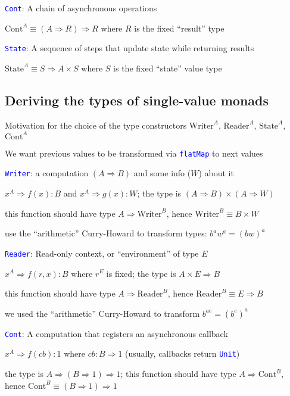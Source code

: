 \texttt{\textcolor{blue}{\footnotesize{}Cont}}: A chain of asynchronous
operations

$\text{Cont}^{A}\equiv\left(A\Rightarrow R\right)\Rightarrow R$ where
$R$ is the fixed ``result'' type

\texttt{\textcolor{blue}{\footnotesize{}State}}: A sequence of steps
that update state while returning results

$\text{State}^{A}\equiv S\Rightarrow A\times S$ where $S$ is the
fixed ``state'' value type


\subsection{Deriving the types of single-value monads}

Motivation for the choice of the type constructors $\text{Writer}^{A}$,
$\text{Reader}^{A}$, $\text{State}^{A}$, $\text{Cont}^{A}$

We want previous values to be transformed via \texttt{\textcolor{blue}{\footnotesize{}flatMap}}
to next values

\texttt{\textcolor{blue}{\footnotesize{}Writer}}: a computation $\left(A\Rightarrow B\right)$
and some info ($W$) about it

$x^{A}\Rightarrow f(x):B$ and $x^{A}\Rightarrow g(x):W$; the type
is $\left(A\Rightarrow B\right)\times\left(A\Rightarrow W\right)$

this function should have type $A\Rightarrow\text{Writer}^{B}$, hence
$\text{Writer}^{B}\equiv B\times W$ 

use the ``arithmetic'' Curry-Howard to transform types: $b^{a}w^{a}=(bw)^{a}$

\texttt{\textcolor{blue}{\footnotesize{}Reader}}: Read-only context,
or ``environment'' of type $E$

$x^{A}\Rightarrow f(r,x):B$ where $r^{E}$ is fixed; the type is
$A\times E\Rightarrow B$

this function should have type $A\Rightarrow\text{Reader}^{B}$, hence
$\text{Reader}^{B}\equiv E\Rightarrow B$

we used the ``arithmetic'' Curry-Howard to transform $b^{ae}=(b^{e})^{a}$

\texttt{\textcolor{blue}{\footnotesize{}Cont}}: A computation that
registers an asynchronous callback

$x^{A}\Rightarrow f(cb):1$ where $cb:B\Rightarrow1$ (usually, callbacks
return \texttt{\textcolor{blue}{\footnotesize{}Unit}})

the type is{\footnotesize{} $A\Rightarrow\left(B\Rightarrow1\right)\Rightarrow1$};
this function should have type {\footnotesize{}$A\Rightarrow\text{Cont}^{B}$},
hence{\footnotesize{} $\text{Cont}^{B}\equiv\left(B\Rightarrow1\right)\Rightarrow1$}{\footnotesize\par}

